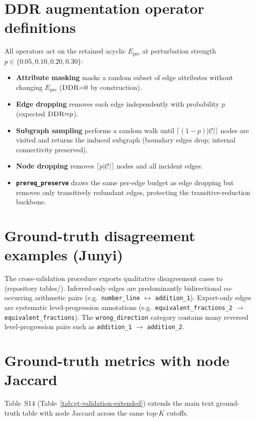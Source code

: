 \documentclass[pdflatex,sn-mathphys-num]{sn-jnl}
\newcommand{\Epre}{\ensuremath{E_{\text{pre}}}}
\newcommand{\DDR}{\textsc{DDR}}
\begin{document}
\section{DDR augmentation operator definitions}
\label{sec:supp-operators}
All operators act on the retained acyclic $\Epre$ at perturbation strength
$p\in\{0.05,0.10,0.20,0.30\}$:
\begin{itemize}
  \item \textbf{Attribute masking} masks a random subset of edge attributes
  without changing $\Epre$ ($\DDR{=}0$ by construction).
  \item \textbf{Edge dropping} removes each edge independently with probability
  $p$ (expected $\DDR{\approx}p$).
  \item \textbf{Subgraph sampling} performs a random walk until
  $\lceil(1-p)|\mathcal{C}|\rceil$ nodes are visited and returns the induced
  subgraph (boundary edges drop; internal connectivity preserved).
  \item \textbf{Node dropping} removes $\lceil p|\mathcal{C}|\rceil$ nodes and
  all incident edges.
  \item \textbf{\texttt{prereq\_preserve}} draws the same per-edge budget as
  edge dropping but removes only transitively redundant edges, protecting the
  transitive-reduction backbone.
\end{itemize}

\section{Ground-truth disagreement examples (Junyi)}
\label{sec:supp-disagreement}
The cross-validation procedure exports qualitative disagreement cases to
 (repository tables/). Inferred-only edges are
predominantly bidirectional co-occurring arithmetic pairs (e.g.\
\texttt{number\_line} $\leftrightarrow$ \texttt{addition\_1}). Expert-only
edges are systematic level-progression annotations (e.g.\
\texttt{equivalent\_fractions\_2} $\rightarrow$ \texttt{equivalent\_fractions}).
The \texttt{wrong\_direction} category contains many reversed level-progression
pairs such as \texttt{addition\_1} $\rightarrow$ \texttt{addition\_2}.

\section{Ground-truth metrics with node Jaccard}
\label{sec:supp-gtxv-extended}
Table~S14 (Table~\ref{tab:gt-validation-extended}) extends the main text
ground-truth table with node Jaccard across the same top-$K$ cutoffs.
\end{document}

